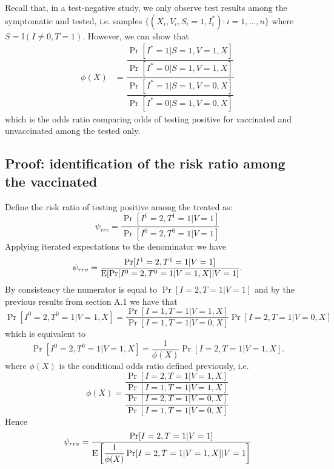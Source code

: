 \begin{appendix}
Recall that, in a test-negative study, we only observe test results among the symptomatic and tested, i.e. samples $\{(X_i, V_i, S_i = 1, I^*_i) : i = 1, \ldots, n\}$ where $S = \mathbb{I}(I \neq 0, T = 1)$. However, we can show that 
    \begin{align*}
         \phi(X) &= \dfrac{\dfrac{\Pr[I^* = 1 | S = 1, V = 1, X]}{\Pr[I^* = 0 | S = 1, V = 1, X]}}{\dfrac{\Pr[I^* = 1 | S = 1, V = 0, X]}{\Pr[I^* = 0 | S = 1, V = 0, X]}}
    \end{align*}    
which is the odds ratio comparing odds of testing positive for vaccinated and unvaccinated among the tested only.

\subsection{Proof: identification of the risk ratio among the vaccinated}
Define the risk ratio of testing positive among the treated as:
\begin{equation*}
    \psi_{rrv} = \dfrac{\Pr[I^1 = 2, T^1 = 1 | V = 1]}{\Pr[I^0 = 2, T^0 = 1 | V = 1]}
\end{equation*}
Applying iterated expectations to the denominator we have
\begin{equation*}
    \psi_{rrv} = \dfrac{\Pr[I^1 = 2, T^1 = 1 | V = 1]}{\operatorname{E}[\Pr[I^0 = 2, T^0 = 1 | V = 1, X] | V = 1]}.
\end{equation*}
By consistency the numerator is equal to $\Pr[I = 2, T = 1 | V = 1]$ and by the previous results from section A.1 we have that 
\begin{equation*}
    \Pr[I^0 = 2, T^0 = 1 | V = 1, X] = \dfrac{\Pr[I = 1, T = 1 | V = 1, X]}{\Pr[I = 1, T = 1 | V = 0, X]} \Pr[I = 2, T = 1 | V = 0, X]
\end{equation*}
which is equivalent to 
\begin{equation*}
    \Pr[I^0 = 2, T^0 = 1 | V = 1, X] = \dfrac{1}{\phi(X)} \Pr[I = 2, T = 1 | V = 1, X].
\end{equation*}
where $\phi(X)$ is the conditional odds ratio defined previously, i.e.
\begin{equation*}
    \phi(X) = \dfrac{\dfrac{\Pr[I = 2, T = 1 | V = 1, X]}{\Pr[I = 1, T = 1 | V = 1, X]}}{\dfrac{\Pr[I = 2, T = 1 | V = 0, X]}{\Pr[I = 1, T = 1 | V = 0, X]}}
\end{equation*}
Hence
\begin{equation*}
    \psi_{rrv} = \dfrac{\Pr[I = 2, T = 1 | V = 1]}{\operatorname{E}\left[\dfrac{1}{\phi(X)} \Pr[I = 2, T = 1 | V = 1, X] | V = 1\right]} 
\end{equation*}

\end{appendix}
